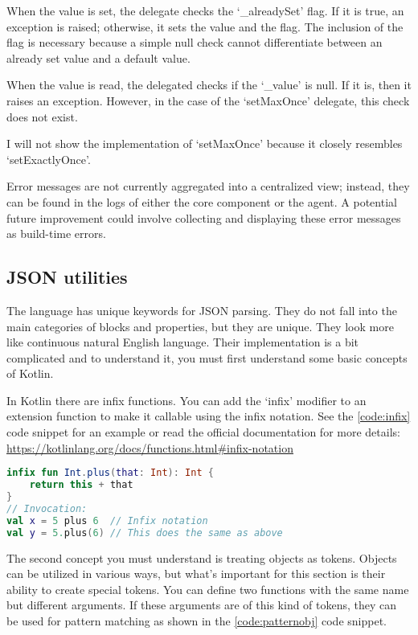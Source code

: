 When the value is set, the delegate checks the `\_alreadySet' flag. If it is true, an exception is raised; otherwise, it sets the value and the flag. The inclusion of the flag is necessary because a simple null check cannot differentiate between an already set value and a default value.

When the value is read, the delegated checks if the `\_value' is null. If it is, then it raises an exception. However, in the case of the `setMaxOnce' delegate, this check does not exist.

I will not show the implementation of `setMaxOnce' because it closely resembles `setExactlyOnce'.

Error messages are not currently aggregated into a centralized view; instead, they can be found in the logs of either the core component or the agent. A potential future improvement could involve collecting and displaying these error messages as build-time errors.

\subsection{JSON utilities}

The language has unique keywords for JSON parsing. They do not fall into the main categories of blocks and properties, but they are unique. They look more like continuous natural English language. Their implementation is a bit complicated and to understand it, you must first understand some basic concepts of Kotlin.

In Kotlin there are infix functions. You can add the `infix' modifier to an extension function to make it callable using the infix notation. See the \ref{code:infix} code snippet for an example or read the official documentation for more details: \url{https://kotlinlang.org/docs/functions.html#infix-notation}

\begin{lstlisting}[caption={Infix functions},language=Kotlin,label=code:infix]
infix fun Int.plus(that: Int): Int {
    return this + that
}
// Invocation:
val x = 5 plus 6  // Infix notation
val y = 5.plus(6) // This does the same as above
\end{lstlisting}

The second concept you must understand is treating objects as tokens. Objects can be utilized in various ways, but what's important for this section is their ability to create special tokens. You can define two functions with the same name but different arguments. If these arguments are of this kind of tokens, they can be used for pattern matching as shown in the \ref{code:patternobj} code snippet.

